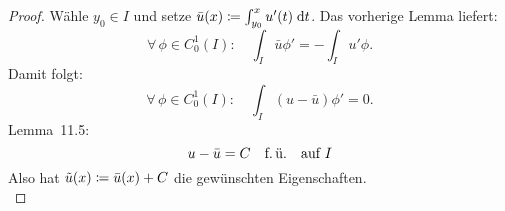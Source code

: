 \begin{proof}
    Wähle $y_0\in I$ und setze $\bar u(x) \defeq \int_{y_0}^x u'(t)\dif{t}$.
    Das vorherige Lemma  liefert:
    \[ \forall\,\phi\in C_0^1(I)\colon\quad
        \int_I \bar u \phi' = -\int_I u'\phi
    . \]
    Damit folgt:
    \[ \forall\,\phi\in C_0^1(I)\colon\quad
        \int_I (u-\bar u) \phi' = 0
    . \]
    Lemma~11.5:
    \[ u-\bar u = C \mfu \text{\quad auf $I$} \]
    Also hat $\tilde u(x) \defeq \bar u(x) + C$ die gewünschten Eigenschaften.
    \\
\end{proof}
